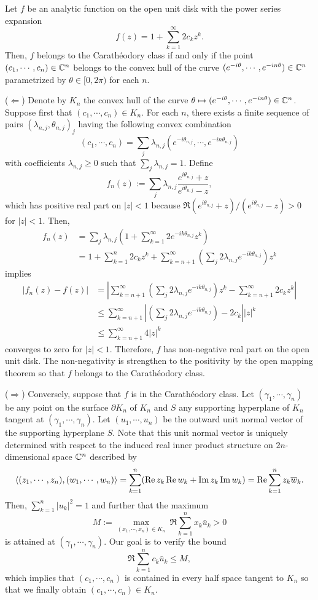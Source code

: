 \documentclass[12pt]{article}
\begin{document}
\begin{thm}
Let $f$ be an analytic function on the open unit disk with the power series expansion
\[f(z)=1+\sum_{k=1}^\infty2c_kz^k.\]
Then, $f$ belongs to the Carath\'eodory class if and only if the point $(c_1,\cdots,c_n)\in\mathbb{C}^n$ belongs to the convex hull of the curve $(e^{-i\theta},\cdots,e^{-in\theta})\in\mathbb{C}^n$ parametrized by $\theta\in[0,2\pi)$ for each $n$.
\end{thm}
\begin{pf}
($\Leftarrow$)
Denote by $K_n$ the convex hull of the curve $\theta\mapsto(e^{-i\theta},\cdots,e^{-in\theta})\in\mathbb{C}^n$.
Suppose first that $(c_1,\cdots,c_n)\in K_n$.
For each $n$, there exists a finite sequence of pairs $(\lambda_{n,j},\theta_{n,j})_j$ having the following convex combination
\[(c_1,\cdots,c_n)=\sum_j\lambda_{n,j}(e^{-i\theta_{n,j}},\cdots,e^{-in\theta_{n,j}})\]
with coefficients $\lambda_{n,j}\ge0$ such that $\sum_j\lambda_{n,j}=1$.
Define
\[f_n(z):=\sum_j\lambda_{n,j}\frac{e^{i\theta_{n,j}}+z}{e^{i\theta_{n,j}}-z},\]
which has positive real part on $|z|<1$ because $\Re(e^{i\theta_{n,j}}+z)/(e^{i\theta_{n,j}}-z)>0$ for $|z|<1$.
Then,
\begin{align*}
f_n(z)
&=\sum_j\lambda_{n,j}(1+\sum_{k=1}^\infty2e^{-ik\theta_{n,j}}z^k)\\
&=1+\sum_{k=1}^n2c_kz^k+\sum_{k=n+1}^\infty\left(\sum_j2\lambda_{n,j}e^{-ik\theta_{n,j}}\right)z^k
\end{align*}
implies
\begin{align*}
|f_n(z)-f(z)|
&=\left|\sum_{k=n+1}^\infty\left(\sum_j2\lambda_{n,j}e^{-ik\theta_{n,j}}\right)z^k-\sum_{k=n+1}^\infty2c_kz^k\right|\\
&\le\sum_{k=n+1}^\infty\left|\left(\sum_j2\lambda_{n,j}e^{-ik\theta_{n,j}}\right)-2c_k\right||z|^k\\
&\le\sum_{k=n+1}^\infty4|z|^k
\end{align*}
converges to zero for $|z|<1$.
Therefore, $f$ has non-negative real part on the open unit disk.
The non-negativity is strengthen to the positivity by the open mapping theorem so that $f$ belongs to the Carath\'eodory class.

($\Rightarrow$)
Conversely, suppose that $f$ is in the Carath\'eodory class.
Let $(\gamma_1,\cdots,\gamma_n)$ be any point on the surface $\partial K_n$ of $K_n$ and $S$ any supporting hyperplane of $K_n$ tangent at $(\gamma_1,\cdots,\gamma_n)$.
Let $(u_1,\cdots,u_n)$ be the outward unit normal vector of the supporting hyperplane $S$.
Note that this unit normal vector is uniquely determined with respect to the induced real inner product structure on $2n$-dimensional space $\mathbb{C}^n$ described by
\[\langle(z_1,\cdots,z_n),(w_1,\cdots,w_n)\rangle=\sum_{k=1}^n(\operatorname{Re} z_k\operatorname{Re} w_k+\operatorname{Im} z_k\operatorname{Im} w_k)=\operatorname{Re}\sum_{k=1}^nz_k\overline w_k.\]
Then, $\sum_{k=1}^n|u_k|^2=1$ and further that the maximum
\[M:=\max_{(x_1,\cdots,x_n)\in K_n}\ \Re\sum_{k=1}^nx_k\bar u_k>0\]
is attained at $(\gamma_1,\cdots,\gamma_n)$.
Our goal is to verify the bound
\[\Re\sum_{k=1}^nc_k\bar u_k\le M,\]
which implies that $(c_1,\cdots,c_n)$ is contained in every half space tangent to $K_n$ so that we finally obtain $(c_1,\cdots,c_n)\in K_n$.


\end{pf}
\end{document}
